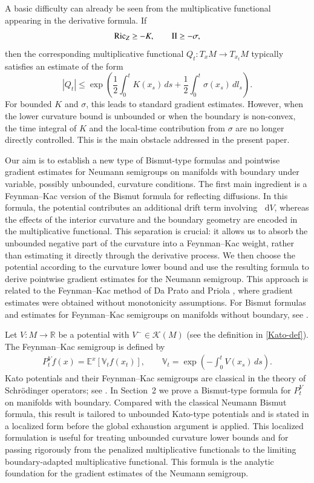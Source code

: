 \documentclass[11pt,twoside, reqno]{article}
\newcommand{\ed}{\mathop{}\!\mathrm{d}}
\def\mathpal#1{\mathop{\mathchoice{\text{\rm #1}}%
   {\text{\rm #1}}{\text{\rm #1}}%
   {\text{\rm #1}}}\nolimits}
\newcommand\Ric{\mathpal{Ric}}
\newcommand\1{\mathbbm{1}}
\newcommand\II{\mathrm{II}}
\theoremstyle{definition}
\numberwithin{equation}{section}
\begin{document}
A basic difficulty can already be seen from the multiplicative functional
appearing in the derivative formula. If
\[
        \Ric_Z\geq -K,
        \qquad
        \II\geq-\sigma,
\]
then the corresponding multiplicative functional \(Q_t:T_xM\to T_{x_t}M\)
typically satisfies an estimate of the form
\[
        |Q_t|
        \leq
        \exp\left(
        \frac12\int_0^tK(x_s)\,ds
        +
        \frac12\int_0^t\sigma(x_s)\,dl_s
        \right).
\]
For bounded \(K\) and \(\sigma\), this leads to standard gradient estimates.
However, when the lower curvature bound is unbounded or when the boundary is
non-convex, the time integral of \(K\) and the local-time contribution from
\(\sigma\) are no longer directly controlled. This is the main obstacle
addressed in the present paper.

Our aim is to establish a new type of Bismut-type formulas and pointwise gradient estimates
for Neumann semigroups on manifolds with boundary under variable, possibly
unbounded, curvature conditions. The first main ingredient is a
Feynman--Kac version of the Bismut formula for reflecting diffusions. In this
formula, the potential contributes an additional drift term involving
\(\ed V\), whereas the effects of the interior curvature and the boundary
geometry are encoded in the multiplicative functional. This separation is
crucial: it allows us to absorb the unbounded negative part of the curvature
into a Feynman--Kac weight, rather than estimating it directly through the
derivative process. We then choose the potential according to the curvature
lower bound and use the resulting formula to derive pointwise gradient
estimates for the Neumann semigroup. This approach is related to the
Feynman--Kac method of Da Prato and Priola \cite{DaP2018}, where gradient
estimates were obtained without monotonicity assumptions. For Bismut formulas
and estimates for Feynman--Kac semigroups on manifolds without boundary, see
\cite{Th19,Li2021}.

Let \(V:M\to\mathbb R\) be a potential with \(V^{-}\in\mathcal K(M)\)  (see the definition in \eqref{Kato-def}). The Feynman--Kac semigroup is defined by
\begin{align}\label{eqn-V}
        P_t^Vf(x)
        =
        \mathbb E^x
        \left[
        \mathbb V_t f(x_t)
        \right],
        \qquad
        \mathbb V_t
        =
        \exp\left(-\int_0^tV(x_s)\,ds\right).
\end{align}
Kato potentials and their Feynman--Kac semigroups are classical in the theory
of Schr\"odinger operators; see \cite{Simon,Gu2017,GP15}. In Section~2 we prove
a Bismut-type formula for \(P_t^V\) on manifolds with boundary. Compared
with the classical Neumann Bismut formula, this result is tailored to
unbounded Kato-type potentials and is stated in a localized form before the
global exhaustion argument is applied.  This localized formulation is useful
for treating unbounded curvature lower bounds and for passing rigorously from
the penalized multiplicative functionals to the limiting boundary-adapted
multiplicative functional. This formula is
the analytic foundation for the gradient estimates of the Neumann semigroup.
\end{document}
